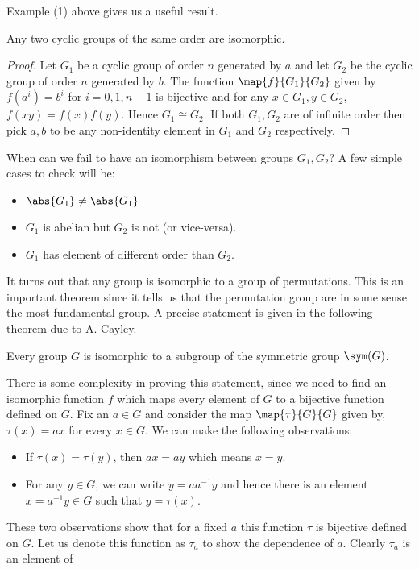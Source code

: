 Example (1) above gives us a useful result.
\begin{Proposition}\label{prop:cyclic_group_iso}
    Any two cyclic groups of the same order are isomorphic.
\end{Proposition}
\begin{proof}
    Let $G_1$ be a cyclic group of order $n$ generated by $a$ and let $G_2$ be the cyclic group of order $n$
    generated by $b$. The function $\map{f}{G_1}{G_2}$ given by $f(a^i) = b^i$ for $i = 0,1,n-1$ is bijective
    and for any $x\in G_1,y\in G_2$, $f(xy) = f(x)f(y)$. Hence $G_1\cong G_2$. If both $G_1,G_2$ are of
    infinite order then pick $a,b$ to be any non-identity element in $G_1$ and $G_2$ respectively.
\end{proof}
When can we fail to have an isomorphism between groups $G_1,G_2$? A few simple cases to check will be:
\begin{itemize}
    \item
	$\abs{G_1} \neq \abs{G_1}$
    \item
	$G_1$ is abelian but $G_2$ is not (or vice-versa).
    \item
	$G_1$ has element of different order than $G_2$.
\end{itemize}
It turns out that any group is isomorphic to a group of permutations. This is an important theorem since it
tells us that the permutation group are in some sense the most fundamental group. A precise statement is given
in the following theorem due to A. Cayley.
\begin{Theorem}[name = Cayley's theorem]\label{thm:cayley_thm}
    Every group $G$ is isomorphic to a subgroup of the symmetric group $\sym(G)$.
\end{Theorem}
There is some complexity in proving this statement, since we need to find an isomorphic function $f$ which
maps every element of $G$ to a bijective function defined on $G$. Fix an $a \in G$ and consider the map 
$\map{\tau}{G}{G}$ given by, $\tau(x) = ax$ for every $x \in G$. We can make the following observations:
\begin{itemize}
    \item
	If $\tau(x) = \tau(y)$, then $ax = ay$ which means $x = y$.
    \item
	For any $y \in G$, we can write $y = aa^{-1}y$ and hence there is an element $x = a^{-1}y \in G$ such
	that $y = \tau(x)$.
\end{itemize}
These two observations show that for a fixed $a$ this function $\tau$ is bijective defined on $G$. Let us
denote this function as $\tau_{a}$ to show the dependence of $a$. Clearly $\tau_{a}$ is an element of
